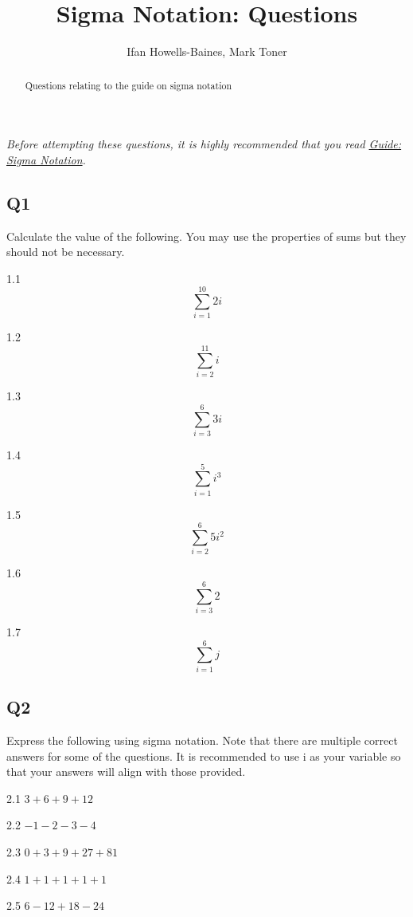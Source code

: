 \documentclass[
  12pt,
  a4paper, oneside]{starmastarticle}
\title{Sigma Notation: Questions}
\author{Ifan Howells-Baines, Mark Toner}
\date{}
\begin{document}
\maketitle
\begin{abstract}
Questions relating to the guide on sigma notation
\end{abstract}
\ifdefined\Shaded\renewenvironment{Shaded}{\begin{tcolorbox}[interior hidden, sharp corners, boxrule=0pt, borderline west={3pt}{0pt}{shadecolor}, enhanced, breakable, frame hidden]}{\end{tcolorbox}}\fi

\emph{Before attempting these questions, it is highly recommended that
you read \href{sigmanotation.qmd}{Guide: Sigma Notation}.}

\hypertarget{q1}{%
\subsection*{Q1}\label{q1}}

Calculate the value of the following. You may use the properties of sums
but they should not be necessary.

1.1 \[\sum_{i = 1}^{10} 2i\]

1.2 \[\sum_{i = 2}^{11} i\]

1.3 \[\sum_{i = 3}^{6} 3i\]

1.4 \[\sum_{i = 1}^{5} i^3\]

1.5 \[\sum_{i = 2}^{6} 5i^2\]

1.6 \[\sum_{i = 3}^{6} 2\]

1.7 \[\sum_{i = 1}^{6} j\]

\hypertarget{q2}{%
\subsection*{Q2}\label{q2}}

Express the following using sigma notation. Note that there are multiple
correct answers for some of the questions. It is recommended to use i as
your variable so that your answers will align with those provided.

2.1 \(3 + 6 + 9 + 12\)

2.2 \(- 1 - 2 - 3 - 4\)

2.3 \(0 + 3 + 9 + 27 + 81\)

2.4 \(1 + 1 + 1 + 1 + 1\)

2.5 \(6 - 12 + 18 - 24\)
\end{document}
